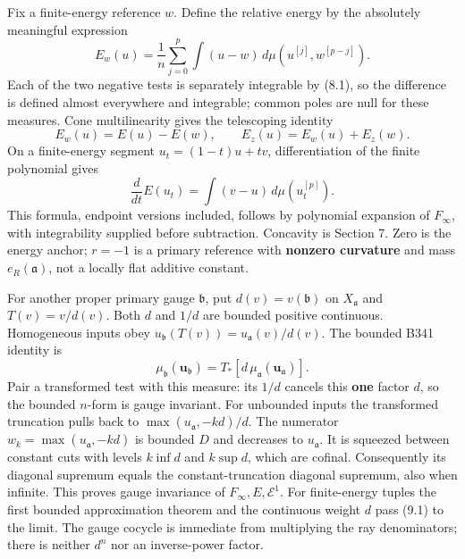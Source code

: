 \documentclass[
]{article}
\begin{document}
Fix a finite-energy reference \(w\). Define the relative energy by the
absolutely meaningful expression
\[E_w(u)=\frac1n\sum_{j=0}^{p}\int(u-w)\,d\mu(u^{[j]},w^{[p-j]}).\] Each
of the two negative tests is separately integrable by (8.1), so the
difference is defined almost everywhere and integrable; common poles are
null for these measures. Cone multilinearity gives the telescoping
identity \[E_w(u)=E(u)-E(w),\qquad E_z(u)=E_w(u)+E_z(w).\] On a
finite-energy segment \(u_t=(1-t)u+tv\), differentiation of the finite
polynomial gives \[\frac d{dt}E(u_t)=\int(v-u)\,d\mu(u_t^{[p]}).\] This
formula, endpoint versions included, follows by polynomial expansion of
\(F_\infty\), with integrability supplied before subtraction. Concavity
is Section 7. Zero is the energy anchor; \(r=-1\) is a primary reference
with \textbf{nonzero curvature} and mass \(e_R(\mathfrak a)\), not a
locally flat additive constant.

For another proper primary gauge \(\mathfrak b\), put
\(d(v)=v(\mathfrak b)\) on \(X_{\mathfrak a}\) and \(T(v)=v/d(v)\). Both
\(d\) and \(1/d\) are bounded positive continuous. Homogeneous inputs
obey \(u_{\mathfrak b}(T(v))=u_{\mathfrak a}(v)/d(v)\). The bounded B341
identity is
\[\mu_{\mathfrak b}(\boldsymbol u_{\mathfrak b})=T_*[d\,\mu_{\mathfrak a}(\boldsymbol u_{\mathfrak a})].\tag{9.1}\]
Pair a transformed test with this measure: its \(1/d\) cancels this
\textbf{one} factor \(d\), so the bounded \(n\)-form is gauge invariant.
For unbounded inputs the transformed truncation pulls back to
\(\max(u_{\mathfrak a},-kd)/d\). The numerator
\(w_k=\max(u_{\mathfrak a},-kd)\) is bounded \(D\) and decreases to
\(u_{\mathfrak a}\). It is squeezed between constant cuts with levels
\(k\inf d\) and \(k\sup d\), which are cofinal. Consequently its
diagonal supremum equals the constant-truncation diagonal supremum, also
when infinite. This proves gauge invariance of
\(F_\infty,E,\mathcal E^1\). For finite-energy tuples the first bounded
approximation theorem and the continuous weight \(d\) pass (9.1) to the
limit. The gauge cocycle is immediate from multiplying the ray
denominators; there is neither \(d^n\) nor an inverse-power factor.
\end{document}
